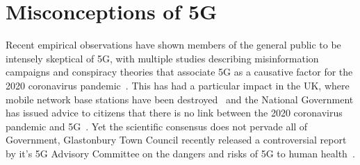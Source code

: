 \section{Misconceptions of 5G}
Recent empirical observations have shown members of the general public to be
intensely skeptical of 5G, with multiple studies describing misinformation
campaigns and conspiracy theories that associate 5G as a causative factor for
the 2020 coronavirus
pandemic~\cite{ahmed2020dangerous,shahsavari2020conspiracy,pummerer2020conspiracy}.
This has had a particular impact in the UK, where mobile network base stations
have been destroyed~\cite{ahmed2020dangerous} and the National Government has
issued advice to citizens that there is no link between the 2020 coronavirus
pandemic and 5G~\cite{uk2020covid}. Yet the scientific consensus does not
pervade all of Government, Glastonbury Town Council recently released a
controversial report by it's 5G Advisory Committee on the dangers and risks of
5G to human health~\cite{glastonbury20205g}.
